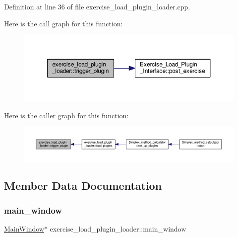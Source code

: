 Definition at line 36 of file exercise\+\_\+load\+\_\+plugin\+\_\+loader.\+cpp.

Here is the call graph for this function\+:\nopagebreak
\begin{figure}[H]
\begin{center}
\leavevmode
\includegraphics[width=350pt]{classexercise__load__plugin__loader_a43ae5461bec5ad5a7afdb25a4ae2b021_cgraph}
\end{center}
\end{figure}
Here is the caller graph for this function\+:\nopagebreak
\begin{figure}[H]
\begin{center}
\leavevmode
\includegraphics[width=350pt]{classexercise__load__plugin__loader_a43ae5461bec5ad5a7afdb25a4ae2b021_icgraph}
\end{center}
\end{figure}


\subsection{Member Data Documentation}
\mbox{\label{classexercise__load__plugin__loader_a94b804f5276c83ac1877a161d012df6d}} 
\subsubsection{\texorpdfstring{main\+\_\+window}{main\_window}}
{\footnotesize\ttfamily \hyperlink{classMainWindow}{Main\+Window}$\ast$ exercise\+\_\+load\+\_\+plugin\+\_\+loader\+::main\+\_\+window\hspace{0.3cm}{\ttfamily [private]}}




